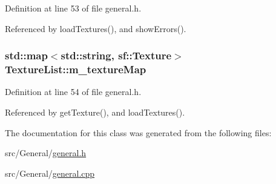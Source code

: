 Definition at line 53 of file general.\-h.



Referenced by load\-Textures(), and show\-Errors().

\hypertarget{class_texture_list_a1e82ecc17a450b6afa112753bcaf139e}{
\subsubsection[{m\-\_\-texture\-Map}]{\setlength{\rightskip}{0pt plus 5cm}std\-::map$<$std\-::string, sf\-::\-Texture$>$ Texture\-List\-::m\-\_\-texture\-Map\hspace{0.3cm}{\ttfamily [private]}}}\label{class_texture_list_a1e82ecc17a450b6afa112753bcaf139e}


Definition at line 54 of file general.\-h.



Referenced by get\-Texture(), and load\-Textures().



The documentation for this class was generated from the following files\-:\begin{DoxyCompactItemize}
\item 
src/\-General/\hyperlink{general_8h}{general.\-h}\item 
src/\-General/\hyperlink{general_8cpp}{general.\-cpp}\end{DoxyCompactItemize}
